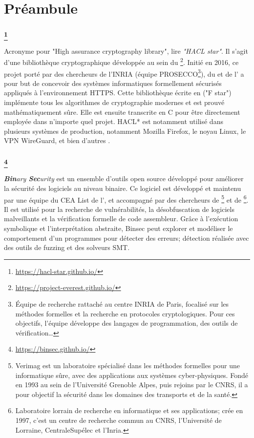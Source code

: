\chapter*{Préambule}
\label{chap:prelude}


\subsection*{ \footnote{\url{https://hacl-star.github.io/}}}
Acronyme pour "High assurance cryptography library", lire \textit{"HACL star"}. Il s'agit d'une bibliothèque cryptographique développée au sein du \textbf{}\footnote{\url{https://project-everest.github.io/}}. Initié en 2016, ce projet porté par des chercheurs de l'INRIA (équipe PROSECCO\footnote{Équipe de recherche rattaché au centre INRIA de Paris, focalisé sur les méthodes formelles et la recherche en protocoles cryptologiques. Pour ces objectifs, l'équipe développe des langages de programmation, des outils de vérification\dots}), du  et de l' a pour but de concevoir des systèmes informatiques formellement sécurisés appliqués à l'environnement HTTPS. Cette bibliothèque écrite en  ("F star") implémente tous les algorithmes de cryptographie modernes et est prouvé mathématiquement sûre. Elle est ensuite transcrite en C pour être directement employée dans n'importe quel projet. HACL* est notamment utilisé dans plusieurs systèmes de production, notamment Mozilla Firefox, le noyau Linux, le VPN WireGuard, et bien d'autres \etc.


\subsection*{ \footnote{\url{https://binsec.github.io/}}}
\textit{\textbf{Bin}ary \textbf{Sec}urity} est un ensemble d'outils open source développé pour améliorer la sécurité des logiciels au niveau binaire. Ce logiciel est développé et maintenu par une équipe du CEA List de l', et accompagné par des chercheurs de \footnote{Verimag est un laboratoire spécialisé dans les méthodes formelles pour une informatique sûre, avec des applications aux systèmes cyber-physiques. Fondé en 1993 au sein de l'Université Grenoble Alpes, puis rejoins par le CNRS, il a pour objectif la sécurité dans les domaines des transports et de la santé.} et de \footnote{Laboratoire lorrain de recherche en informatique et ses applications; crée en 1997, c'est un centre de recherche commun au CNRS, l'Université de Lorraine, CentraleSupélec et l'Inria.}. Il est utilisé pour la recherche de vulnérabilités, la désobfuscation de logiciels malveillants et la vérification formelle de code assembleur. Grâce à l'exécution symbolique et l'interprétation abstraite, Binsec peut explorer et modéliser le comportement d'un programmes pour détecter des erreurs; détection réalisée avec des outils de fuzzing et des solveurs SMT.
